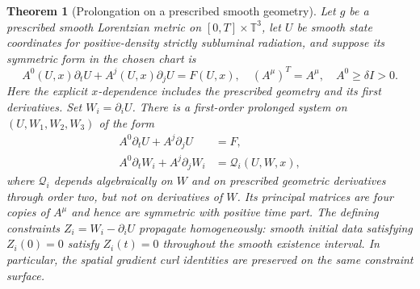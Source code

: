 \documentclass[10pt,a4paper]{article}
\newtheorem{theorem}{Theorem}[section]
\newcommand{\T}{\mathbb T}
\begin{document}
\begin{theorem}[Prolongation on a prescribed smooth geometry]\label{thm:prolong}
Let $g$ be a prescribed smooth Lorentzian metric on $[0,T]\times\T^3$, let $U$ be smooth state coordinates for positive-density strictly subluminal radiation, and suppose its symmetric form in the chosen chart is
\begin{equation}\label{eq:general}
A^0(U,x)\partial_t U+A^j(U,x)\partial_jU=F(U,x),
\quad (A^\mu)^T=A^\mu,\quad A^0\ge\delta I>0.
\end{equation}
Here the explicit $x$-dependence includes the prescribed geometry and its first derivatives. Set $W_i=\partial_iU$. There is a first-order prolonged system on $(U,W_1,W_2,W_3)$ of the form
\begin{align}\label{eq:prolong}
A^0\partial_tU+A^j\partial_j U&=F,\\
A^0\partial_tW_i+A^j\partial_jW_i&=\mathcal Q_i(U,W,x),
\end{align}
where $\mathcal Q_i$ depends algebraically on $W$ and on prescribed geometric derivatives through order two, but not on derivatives of $W$. Its principal matrices are four copies of $A^\mu$ and hence are symmetric with positive time part. The defining constraints $Z_i=W_i-\partial_iU$ propagate homogeneously: smooth initial data satisfying $Z_i(0)=0$ satisfy $Z_i(t)=0$ throughout the smooth existence interval. In particular, the spatial gradient curl identities are preserved on the same constraint surface.
\end{theorem}
\end{document}

